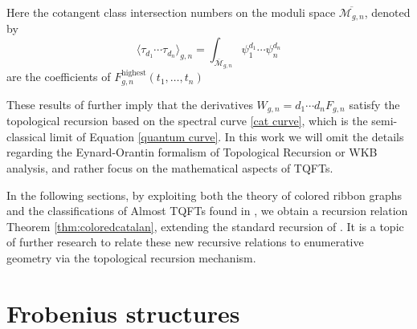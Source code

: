 \documentclass{amsart}
\newcommand{\be}{\begin{equation}}
\newcommand{\ee}{\end{equation}}
\newcommand{\Mbar}{{\overline{\mathcal{M}}}}
\newcommand{\la}{{\langle}}
\newcommand{\ra}{{\rangle}}
\theoremstyle{definition}
\begin{document}
Here the cotangent class intersection  numbers on the moduli space $\overline{\mathcal{M}_{g,n}}$, denoted by 
\be
\label{intersection}
\la \tau_{d_1}\cdots \tau_{d_n}\ra_{g,n} =
\int_{\Mbar_{g,n}}
\psi_1 ^{d_1}\cdots \psi_{n}^{d_n}
\ee
are the coefficients of  $F^{\text{highest}}_{g,n}(t_1,\dots,t_n)$


These results of \cite{DMSS} further imply that
the derivatives $W_{g,n}=d_1\cdots d_n F_{g,n}$ 
satisfy the topological recursion based on 
the spectral curve \eqref{cat curve}, which is the
semi-classical limit of Equation \eqref{quantum curve}. In this work we will omit the details regarding the Eynard-Orantin formalism of Topological Recursion or WKB analysis, and rather focus on the mathematical aspects of TQFTs.




















In the following sections, by exploiting both the theory of colored ribbon graphs  and the classifications of Almost TQFTs found in \cite{DaDu}, we obtain a recursion relation Theorem \ref{thm:coloredcatalan}, extending the standard recursion of \cite{DMSS}. It is a topic of further research to relate these new recursive relations to enumerative geometry via the topological recursion mechanism.









\section{Frobenius structures}\label{Frob section}
\end{document}
